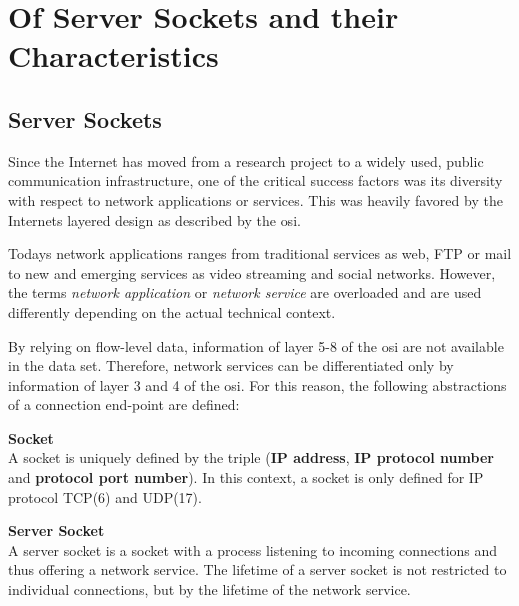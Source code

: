 \chapter{Of Server Sockets and their Characteristics
\label{chapter:sockets}}

\section{Server Sockets}
Since the Internet has moved from a research project to a widely used, public
communication infrastructure, one of the critical success factors was its
diversity with respect to network applications or services. This was heavily
favored by the Internets layered design as described by the \gls{osi}.

Todays network applications ranges from traditional services as web, \gls{FTP}
or mail to new and emerging services as video streaming and social networks.
However, the terms \emph{network application} or \emph{network service} are
overloaded and are used differently depending on the actual technical context.

By relying on flow-level data, information of layer 5-8 of the \gls{osi} are not
available in the data set. Therefore, network services can be differentiated
only by information of layer 3 and 4 of the \gls{osi}. For this reason, the
following abstractions of a connection end-point are defined:

\parbox{
\textwidth}{
\begin{defn}
	{\textbf{Socket}\\} A socket is uniquely defined by the triple (\textbf{IP address}, \textbf{IP protocol number} and \textbf{protocol port number}). In this context, a socket is only defined for IP protocol \gls{TCP}(6) and \gls{UDP}(17).
\end{defn}
}
\parbox{
\textwidth}{
\begin{defn}
	{\textbf{Server Socket
	\label{def:serversocket}}\\} A server socket is a socket with a process listening to incoming connections and thus offering a network service. The lifetime of a server socket is not restricted to individual connections, but by the lifetime of the network service.
\end{defn}
}

